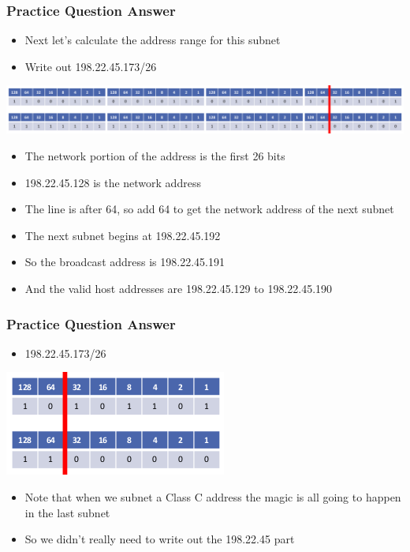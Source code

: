 \documentclass[pdflatex,compress]{beamer}
\begin{document}
\begin{frame}
	\frametitle{Practice Question Answer}
	\begin{itemize}
		\item Next let’s calculate the address range for this subnet
		\item Write out 198.22.45.173/26
	\end{itemize}	
	\begin{center}
		\includegraphics[width=1\linewidth]{img/img07}
	\end{center}
	\begin{itemize}
		\item The network portion of the address is the first 26 bits
		\item 198.22.45.128 is the network address
		\item The line is after 64, so add 64 to get the network address of the next subnet
		\item The next subnet begins at 198.22.45.192
		\item So the broadcast address is 198.22.45.191
		\item And the valid host addresses are 198.22.45.129 to 198.22.45.190
	\end{itemize}
\end{frame}

\begin{frame}
	\frametitle{Practice Question Answer}
	\begin{itemize}
		\item 198.22.45.173/26
	\end{itemize}	
	\begin{center}
		\includegraphics[width=0.5\linewidth]{img/img08}
	\end{center}
	\begin{itemize}
		\item Note that when we subnet a Class C address the magic is all going to happen in the last subnet
		\item So we didn’t really need to write out the 198.22.45 part
	\end{itemize}
\end{frame}
\end{document}
